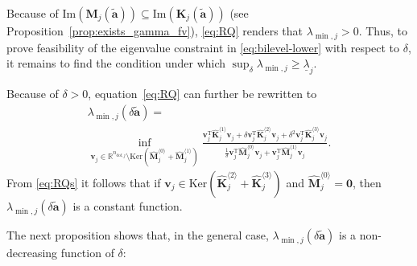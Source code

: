 \documentclass[final,onefignum,onetabnum]{siamart220329}
\begin{document}
{Because of} $\mathrm{Im}\left(\mathbf{M}_{j}(\tilde{\mathbf{a}})\right) \subseteq \mathrm{Im}\left(\mathbf{K}_{j}(\tilde{\mathbf{a}})\right)$ (see Proposition~\ref{prop:exists_gamma_fv}), \eqref{eq:RQ} renders that $\lambda_{\min,j}>0$. Thus, to prove feasibility of the eigenvalue constraint in \eqref{eq:bilevel-lower} with respect to $\delta$, it remains to find the condition under which $\sup_{\delta} \lambda_{\min,j} \ge \underline{\lambda}_j$. 

Because of $\delta > 0$, equation~\eqref{eq:RQ} can further be rewritten to
%
\begin{equation}\label{eq:RQs}
	\begin{multlined}
		\lambda_{\min,j}(\delta \tilde{\mathbf{a}}) =\\
		\inf_{\mathbf{v}_j \in \mathbb{R}^{n_{\mathrm{dof},j}}\setminus \mathrm{Ker}\left(\hat{\mathbf{M}}_j^{\langle 0\rangle}+\hat{\mathbf{M}}_j^{\langle 1\rangle}\right)} \frac{\mathbf{v}_j^\mathrm{T} \hat{\mathbf{K}}_j^{\langle 1\rangle}\mathbf{v}_j + \delta \mathbf{v}_j^\mathrm{T}\hat{\mathbf{K}}_j^{\langle 2\rangle} \mathbf{v}_j + \delta^2 \mathbf{v}_j^\mathrm{T}\hat{\mathbf{K}}_j^{\langle 3\rangle} \mathbf{v}_j}{\frac{1}{\delta}\mathbf{v}_j^\mathrm{T} \hat{\mathbf{M}}_j^{\langle 0\rangle} \mathbf{v}_j + \mathbf{v}_j^\mathrm{T} \hat{\mathbf{M}}_j^{\langle 1\rangle} \mathbf{v}_j}.
	\end{multlined}
\end{equation}
%
From \eqref{eq:RQs} it follows that if $\mathbf{v}_j \in \mathrm{Ker}\left(\hat{\mathbf{K}}_j^{\langle 2\rangle} + \hat{\mathbf{K}}_j^{\langle 3\rangle}\right)$ and $\hat{\mathbf{M}}_j^{\langle 0\rangle} = \mathbf{0}$, then $\lambda_{\min,j}(\delta \tilde{\mathbf{a}})$ is a constant function. %

The next proposition shows that, in the general case, $\lambda_{\min,j}(\delta \tilde{\mathbf{a}})$ is a non-decreasing function of $\delta$:
\end{document}
